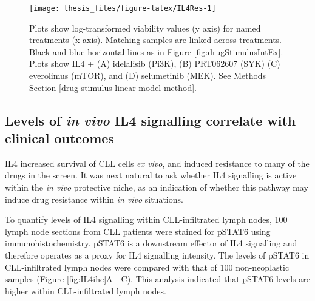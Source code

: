 \documentclass[11pt, a4paper, twosided]{book}
\begin{document}
\begin{figure}

{\centering \texttt{[image: thesis\_files/figure-latex/IL4Res-1]} 

}

\caption{Plots show log-transformed viability values (y axis) for named treatments (x axis). Matching samples are linked across treatments. Black and blue horizontal lines as in Figure \ref{fig:drugStimulusIntEx}. Plots show IL4 + (A) idelalisib (Pi3K), (B) PRT062607 (SYK) (C) everolimus (mTOR), and (D) selumetinib (MEK). See Methods Section \ref{drug-stimulus-linear-model-method}.}\label{fig:IL4Res}
\end{figure}
\hypertarget{il4-ihc}{%
\subsection{\texorpdfstring{Levels of \emph{in vivo} IL4 signalling correlate with clinical outcomes}{Levels of in vivo IL4 signalling correlate with clinical outcomes}}\label{il4-ihc}}

IL4 increased survival of CLL cells \emph{ex vivo}, and induced resistance to many of the drugs in the screen. It was next natural to ask whether IL4 signalling is active within the \emph{in vivo} protective niche, as an indication of whether this pathway may induce drug resistance within \emph{in vivo} situations.

To quantify levels of IL4 signalling within CLL-infiltrated lymph nodes, 100 lymph node sections from CLL patients were stained for pSTAT6 using immunohistochemistry. pSTAT6 is a downstream effector of IL4 signalling and therefore operates as a proxy for IL4 signalling intensity. The levels of pSTAT6 in CLL-infiltrated lymph nodes were compared with that of 100 non-neoplastic samples (Figure \ref{fig:IL4ihc}A - C). This analysis indicated that pSTAT6 levels are higher within CLL-infiltrated lymph nodes.
\end{document}
